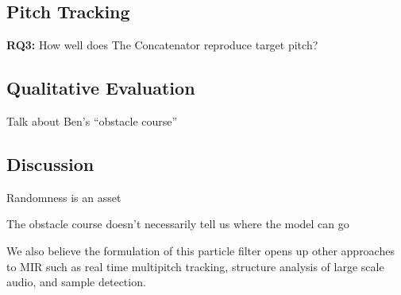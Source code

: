 \documentclass{article}
\begin{document}
\subsection{Pitch Tracking}
\label{sec:quantitativepitch}

\textbf{RQ3:} How well does The Concatenator reproduce target pitch?




\subsection{Qualitative Evaluation}

Talk about Ben's ``obstacle course''

\subsection{Discussion}

Randomness is an asset

The obstacle course doesn't necessarily tell us where the model can go

We also believe the formulation of this particle filter opens up other approaches to MIR such as real time multipitch tracking, structure analysis of large scale audio, and sample detection.



%
%
%
%
%
\end{document}
